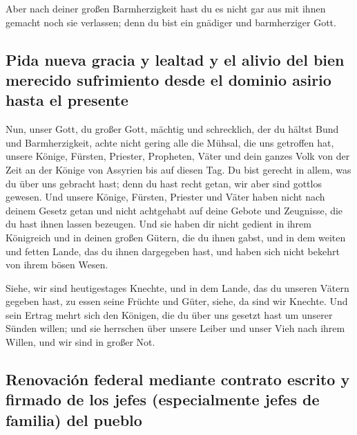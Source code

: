  Aber nach deiner großen Barmherzigkeit hast du es nicht
gar aus mit ihnen gemacht noch sie verlassen; denn du bist ein gnädiger
und barmherziger Gott.

\hypertarget{pida-nueva-gracia-y-lealtad-y-el-alivio-del-bien-merecido-sufrimiento-desde-el-dominio-asirio-hasta-el-presente}{%
\subsection{Pida nueva gracia y lealtad y el alivio del bien merecido
sufrimiento desde el dominio asirio hasta el
presente}\label{pida-nueva-gracia-y-lealtad-y-el-alivio-del-bien-merecido-sufrimiento-desde-el-dominio-asirio-hasta-el-presente}}

 Nun, unser Gott, du großer Gott, mächtig und
schrecklich, der du hältst Bund und Barmherzigkeit, achte nicht gering
alle die Mühsal, die uns getroffen hat, unsere Könige, Fürsten,
Priester, Propheten, Väter und dein ganzes Volk von der Zeit an der
Könige von Assyrien bis auf diesen Tag.  Du bist gerecht
in allem, was du über uns gebracht hast; denn du hast recht getan, wir
aber sind gottlos gewesen.  Und unsere Könige, Fürsten,
Priester und Väter haben nicht nach deinem Gesetz getan und nicht
achtgehabt auf deine Gebote und Zeugnisse, die du hast ihnen lassen
bezeugen.  Und sie haben dir nicht gedient in ihrem
Königreich und in deinen großen Gütern, die du ihnen gabst, und in dem
weiten und fetten Lande, das du ihnen dargegeben hast, und haben sich
nicht bekehrt von ihrem bösen Wesen.

 Siehe, wir sind heutigestages Knechte, und in dem Lande,
das du unseren Vätern gegeben hast, zu essen seine Früchte und Güter,
siehe, da sind wir Knechte.  Und sein Ertrag mehrt sich
den Königen, die du über uns gesetzt hast um unserer Sünden willen; und
sie herrschen über unsere Leiber und unser Vieh nach ihrem Willen, und
wir sind in großer Not.

\hypertarget{renovaciuxf3n-federal-mediante-contrato-escrito-y-firmado-de-los-jefes-especialmente-jefes-de-familia-del-pueblo}{%
\subsection{Renovación federal mediante contrato escrito y firmado de
los jefes (especialmente jefes de familia) del
pueblo}\label{renovaciuxf3n-federal-mediante-contrato-escrito-y-firmado-de-los-jefes-especialmente-jefes-de-familia-del-pueblo}}

